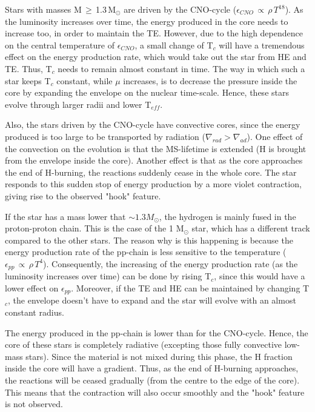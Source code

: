 \documentclass{article}
\begin{document}
\begin{enumerate}
    Stars with masses M\,$\geq$\,1.3\,M$_\odot$ are driven by the CNO-cycle ($\epsilon_{CNO}\,\propto\,\rho\,T^{18}$). As the luminosity increases over time, the energy produced in the core needs to increase too, in order to maintain the TE. However, due to the high dependence on the central temperature of $\epsilon_{CNO}$, a small change of T$_c$ will have a tremendous effect on the energy production rate, which would take out the star from HE and TE. Thus, T$_c$ needs to remain almost constant in time. The way in which such a star keeps T$_c$ constant, while $\mu$ increases, is to decrease the pressure inside the core by expanding the envelope on the nuclear time-scale. Hence, these stars evolve through larger radii and lower T$_{eff}$.
    
    Also, the stars driven by the CNO-cycle have convective cores, since the energy produced is too large to be transported by radiation ($\nabla_{rad} > \nabla_{ad}$). One effect of the convection on the evolution is that the MS-lifetime is extended (H is brought from the envelope inside the core). Another effect is that as the core approaches the end of H-burning, the reactions suddenly cease in the whole core. The star responds to this sudden stop of energy production by a more violet contraction, giving rise to the observed "hook" feature. 
    
    If the star has a mass lower that $\sim 1.3 M_\odot$, the hydrogen is mainly fused in the proton-proton chain. This is the case of the 1 M$_\odot$ star, which has a different track compared to the other stars. The reason why is this happening is because the energy production rate of the pp-chain is less sensitive to the temperature ($\epsilon_{pp}\,\propto\,\rho\,T^{4}$). Consequently, the increasing of the energy production rate (as the luminosity increases over time) can be done by rising T$_c$, since this would have a lower effect on $\epsilon_{pp}$. Moreover, if the TE and HE can be maintained by changing T$_c$, the envelope doesn't have to expand and the star will evolve with an almost constant radius.
    
    The energy produced in the pp-chain is lower than for the CNO-cycle. Hence, the core of these stars is completely radiative (excepting those fully convective low-mass stars). Since the material is not mixed during this phase, the H fraction inside the core will have a gradient. Thus, as the end of H-burning approaches, the reactions will be ceased gradually (from the centre to the edge of the core). This means that the contraction will also occur smoothly and the "hook" feature is not observed.
    

\end{enumerate}
\end{document}
